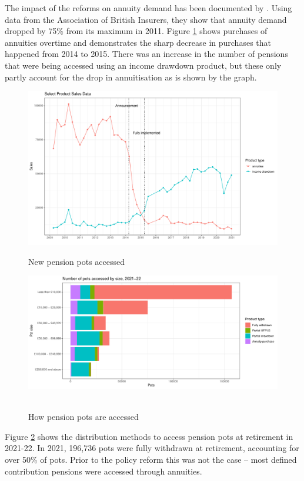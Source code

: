 \documentclass[12pt]{article}
\begin{document}
The impact of the reforms on annuity demand has been documented by
\cite{cannon_et_al_nier_2016}. Using data from the Association of British
Insurers, they show that annuity demand dropped by 75\% from its maximum in
2011. Figure \ref{fig:annovertime} shows purchases of annuities overtime and
demonstrates the sharp decrease in purchases that happened from 2014 to 2015.
There was an increase in the number of pensions that were being accessed using
an income drawdown product, but these only partly account for the drop in
annuitisation as is shown by the graph.
\begin{figure}[h]
    \caption{New pension pots accessed }
    \centering
    \includegraphics[width=0.7\columnwidth]{figures/annuity_overtime.pdf}
    \label{fig:annovertime}
\end{figure}

\begin{figure}[h]
    \caption[Caption for LOF]{How pension pots are accessed\protect\footnotemark}
    \centering
    \includegraphics[width=0.7\columnwidth]{figures/annuity_pot_sizes.pdf}
    \label{fig:ann2122}
    \
\end{figure}
Figure \ref{fig:ann2122} shows the distribution methods to access pension pots
at retirement in 2021-22. In 2021, 196,736 pots were fully withdrawn at
retirement, accounting for over 50\% of pots. Prior to the policy reform this
was not the case -- most defined contribution pensions were accessed through
annuities.
\end{document}
